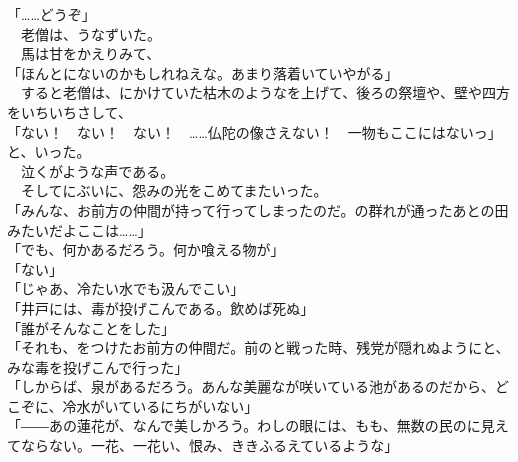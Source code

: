 \documentclass[
  paper=a5,
  fontsize=10pt,
  jafontsize=9.5pt,
  tate,                  %
  open_bracket_pos=nibu, %
]{jlreq}
\begin{document}
「……どうぞ」\\


　老僧は、うなずいた。\\


　馬は甘をかえりみて、\\


「ほんとにないのかもしれねえな。あまり落着いていやがる」\\


　すると老僧は、にかけていた枯木のようなを上げて、後ろの祭壇や、壁や四方をいちいちさして、\\


「ない！　ない！　ない！　……仏陀の像さえない！　一物もここにはないっ」と、いった。\\


　泣くがような声である。\\


　そしてにぶいに、怨みの光をこめてまたいった。\\


「みんな、お前方の仲間が持って行ってしまったのだ。の群れが通ったあとの田みたいだよここは……」\\


「でも、何かあるだろう。何か喰える物が」\\


「ない」\\


「じゃあ、冷たい水でも汲んでこい」\\


「井戸には、毒が投げこんである。飲めば死ぬ」\\


「誰がそんなことをした」\\


「それも、をつけたお前方の仲間だ。前のと戦った時、残党が隠れぬようにと、みな毒を投げこんで行った」\\


「しからば、泉があるだろう。あんな美麗なが咲いている池があるのだから、どこぞに、冷水がいているにちがいない」\\


「――あの蓮花が、なんで美しかろう。わしの眼には、もも、無数の民のに見えてならない。一花、一花い、恨み、ききふるえているような」\\
\end{document}
